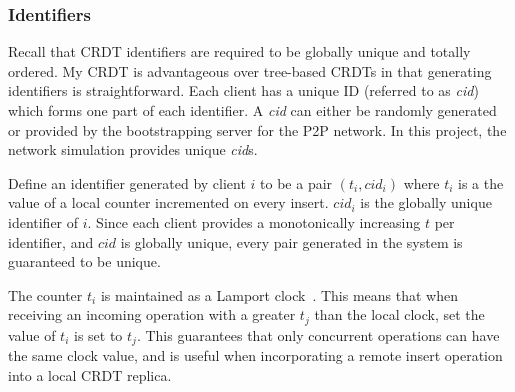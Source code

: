 \documentclass[12pt,a4paper,twoside,openright]{report}
\begin{document}
		
	
		\subsubsection{Identifiers} 	\label{sec:crdt:identifiers}
				
		Recall that CRDT identifiers are required to be globally unique and totally ordered. My CRDT is advantageous over tree-based CRDTs in that generating identifiers is straightforward. Each client has a unique ID (referred to as \textit{cid}) which forms one part of each identifier. A \textit{cid} can either be randomly generated or provided by the bootstrapping server for the P2P network. In this project, the network simulation provides unique \textit{cid}s.
		
		Define an identifier generated by client $i$ to be a pair $(t_i, cid_i)$ where $t_i$ is a the value of a local counter incremented on every insert. $cid_i$ is the globally unique identifier of $i$. Since each client provides a monotonically increasing $t$ per identifier, and $cid$ is globally unique, every pair generated in the system is guaranteed to be unique.
		
		The counter $t_i$ is maintained as a Lamport clock~\cite{lamport1978}. This means that when receiving an incoming operation with a greater $t_j$ than the local clock, set the value of $t_i$ is set to $t_j$. This guarantees that only concurrent operations can have the same clock value, and is useful when incorporating a remote insert operation into a local CRDT replica.
		
\end{document}

